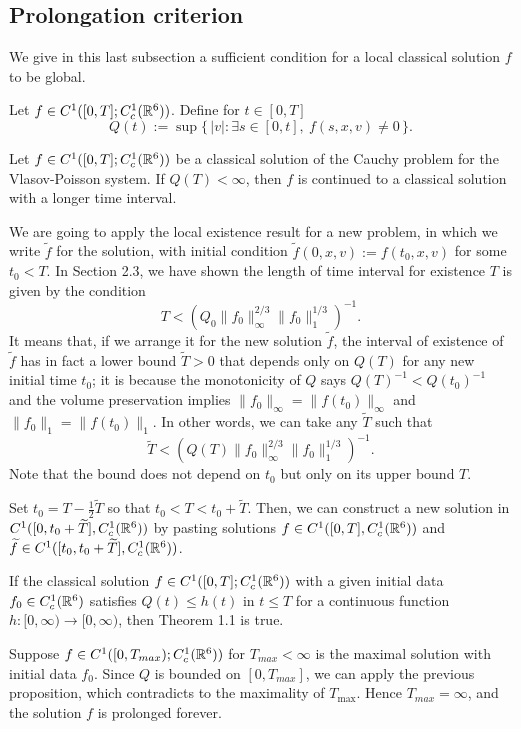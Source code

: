 \documentclass{article}
\begin{document}
\subsection{Prolongation criterion}
We give in this last subsection a sufficient condition for a local classical solution $f$ to be global.
\begin{defn}
Let $f\in C^1([0,T];C_c^1(\mathbb{R}^6))$.
Define for $t\in[0,T]$
\[Q(t):=\sup\{\,|v|:\exists s\in[0,t],\ f(s,x,v)\ne0\,\}.\]
\end{defn}
\begin{prop}
Let $f\in C^1([0,T];C_c^1(\mathbb{R}^6))$ be a classical solution of the Cauchy problem for the Vlasov-Poisson system.
If $Q(T)<\infty$, then $f$ is continued to a classical solution with a longer time interval.
\end{prop}
\begin{pf}
We are going to apply the local existence result for a new problem, in which we write $\tilde f$ for the solution, with initial condition $\tilde f(0,x,v):=f(t_0,x,v)$ for some $t_0<T$.
In Section 2.3, we have shown the length of time interval for existence $T$ is given by the condition
\[T<(Q_0\|f_0\|_\infty^{2/3}\|f_0\|_1^{1/3})^{-1}.\]
It means that, if we arrange it for the new solution $\tilde f$, the interval of existence of $\tilde f$ has in fact a lower bound $\tilde T>0$ that depends only on $Q(T)$ for any new initial time $t_0$; it is because the monotonicity of $Q$ says $Q(T)^{-1}<Q(t_0)^{-1}$ and the volume preservation implies $\|f_0\|_\infty=\|f(t_0)\|_\infty$ and $\|f_0\|_1=\|f(t_0)\|_1$.
In other words, we can take any $\tilde T$ such that
\[\tilde T<(Q(T)\|f_0\|_\infty^{2/3}\|f_0\|_1^{1/3})^{-1}.\]
Note that the bound does not depend on $t_0$ but only on its upper bound $T$.

Set $t_0=T-\frac12\tilde T$ so that $t_0<T<t_0+\tilde T$.
Then, we can construct a new solution in $C^1([0,t_0+\widetilde T],C_c^1(\mathbb{R}^6))$ by pasting solutions $f\in C^1([0,T],C_c^1(\mathbb{R}^6))$ and $\widetilde f\in C^1([t_0,t_0+\widetilde T],C_c^1(\mathbb{R}^6))$.
\end{pf}

\begin{cor}
If the classical solution $f\in C^1([0,T];C_c^1(\mathbb{R}^6))$ with a given initial data $f_0\in C_c^1(\mathbb{R}^6)$ satisfies $Q(t)\le h(t)$ in $t\le T$ for a continuous function $h:[0,\infty)\to[0,\infty)$, then Theorem 1.1 is true.
\end{cor}
\begin{pf}
Suppose $f\in C^1([0,T_{max});C_c^1(\mathbb{R}^6))$ for $T_{max}<\infty$ is the maximal solution with initial data $f_0$.
Since $Q$ is bounded on $[0,T_{max}]$, we can apply the previous proposition, which contradicts to the maximality of $T_{\max}$.
Hence $T_{max}=\infty$, and the solution $f$ is prolonged forever.
\end{pf}
\end{document}
